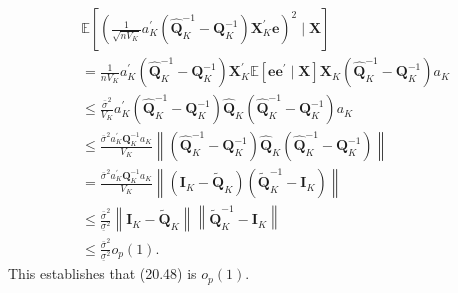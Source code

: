 \documentclass[10pt]{article}
\begin{document}
$$
\begin{aligned}
&\mathbb{E}\left[\left(\frac{1}{\sqrt{n V_{K}}} a_{K}^{\prime}\left(\widehat{\boldsymbol{Q}}_{K}^{-1}-\boldsymbol{Q}_{K}^{-1}\right) \boldsymbol{X}_{K}^{\prime} \boldsymbol{e}\right)^{2} \mid \boldsymbol{X}\right] \\
&=\frac{1}{n V_{K}} a_{K}^{\prime}\left(\widehat{\boldsymbol{Q}}_{K}^{-1}-\boldsymbol{Q}_{K}^{-1}\right) \boldsymbol{X}_{K}^{\prime} \mathbb{E}\left[\boldsymbol{e} \boldsymbol{e}^{\prime} \mid \boldsymbol{X}\right] \boldsymbol{X}_{K}\left(\widehat{\boldsymbol{Q}}_{K}^{-1}-\boldsymbol{Q}_{K}^{-1}\right) a_{K} \\
&\leq \frac{\bar{\sigma}^{2}}{V_{K}} a_{K}^{\prime}\left(\widehat{\boldsymbol{Q}}_{K}^{-1}-\boldsymbol{Q}_{K}^{-1}\right) \widehat{\boldsymbol{Q}}_{K}\left(\widehat{\boldsymbol{Q}}_{K}^{-1}-\boldsymbol{Q}_{K}^{-1}\right) a_{K} \\
&\leq \frac{\bar{\sigma}^{2} a_{K}^{\prime} \boldsymbol{Q}_{K}^{-1} a_{K}}{V_{K}}\left\|\left(\widehat{\boldsymbol{Q}}_{K}^{-1}-\boldsymbol{Q}_{K}^{-1}\right) \widehat{\boldsymbol{Q}}_{K}\left(\widehat{\boldsymbol{Q}}_{K}^{-1}-\boldsymbol{Q}_{K}^{-1}\right)\right\| \\
&=\frac{\bar{\sigma}^{2} a_{K}^{\prime} \boldsymbol{Q}_{K}^{-1} a_{K}}{V_{K}}\left\|\left(\boldsymbol{I}_{K}-\widetilde{\boldsymbol{Q}}_{K}\right)\left(\widetilde{\boldsymbol{Q}}_{K}^{-1}-\boldsymbol{I}_{K}\right)\right\| \\
&\leq \frac{\bar{\sigma}^{2}}{\underline{\sigma}^{2}}\left\|\boldsymbol{I}_{K}-\widetilde{\boldsymbol{Q}}_{K}\right\|\left\|\widetilde{\boldsymbol{Q}}_{K}^{-1}-\boldsymbol{I}_{K}\right\| \\
&\leq \frac{\bar{\sigma}^{2}}{\underline{\sigma}^{2}} o_{p}(1) .
\end{aligned}
$$
This establishes that (20.48) is $o_{p}(1)$.
\end{document}
